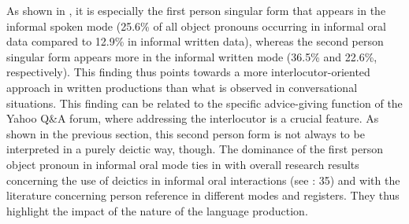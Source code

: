 \documentclass[output=paper]{langscibook}
\begin{document}
As shown in , it is especially the first person singular form that appears in the informal spoken mode (25.6\% of all object pronouns occurring in informal oral data compared to 12.9\% in informal written data), whereas the second person singular form appears more in the informal written mode (36.5\% and 22.6\%, respectively). This finding thus points towards a more interlocutor-oriented approach in written productions than what is observed in conversational situations. This finding can be related to the specific advice-giving function of the Yahoo \mbox{Q\&A} forum, where addressing the interlocutor is a crucial feature. As shown in the previous section, this second person form is not always to be interpreted in a purely deictic way, though. The dominance of the first person object pronoun in informal oral mode ties in with overall research results concerning the use of deictics in informal oral interactions (see \citealt{DeCock2014}: 35) and with the literature concerning person reference in different modes and registers. They thus highlight the impact of the nature of the language production.\largerpage
\end{document}
